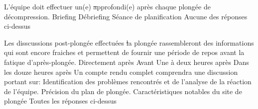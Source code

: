 \documentclass[english,10pt,twoside]{article}
\begin{document}
\begin{outline}
		\1 L'équipe doit effectuer un(e) \st approfondi(e) après chaque plongée de décompression.
			\2 Briefing
			\2 Débriefing
			\2 Séance de planification
			\2 Aucune des réponses ci-dessus 

		\1 Les disscussions post-plongée effectuées \st la plongée rassembleront des informations qui sont encore fraiches et permettent de fournir une période de repos avant la fatique d'après-plongée.
			\2 Directement après
			\2 Avant
			\2 Une à deux heures après
			\2 Dans les douze heures après
		\1 Un compte rendu complet comprendra une discussion portant sur:
			\2 Identification des problèmes rencontrés et de l'analyse de la réaction de l'équipe.
			\2 Précision du plan de plongée.
			\2 Caractéristiques notables du site de plongée
			\2 Toutes les réponses ci-dessus

	\end{outline}
\end{document}

